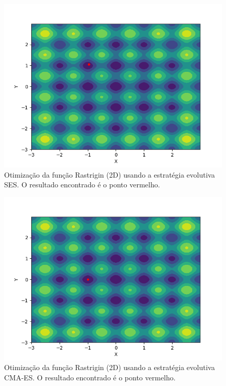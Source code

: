 \documentclass[conference]{IEEEtran}
\begin{document}
\begin{figure}[htbp]
\centering
\centerline{\includegraphics[scale=0.6]{imagens/rastrigin/ses.png}}
\caption{Otimização da função Rastrigin (2D) usando a estratégia evolutiva SES. O resultado encontrado é o ponto vermelho.}
\label{rastrigin/ses}
\end{figure} 

\begin{figure}[htbp]
\centering
\centerline{\includegraphics[scale=0.6]{imagens/rastrigin/cmaes.png}}
\caption{Otimização da função Rastrigin (2D) usando a estratégia evolutiva CMA-ES. O resultado encontrado é o ponto vermelho.}
\label{rastrigin/cmaes}
\end{figure}
\end{document}
